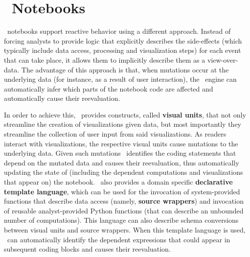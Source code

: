 \section{\projname\ Notebooks}


\projname\ notebooks support reactive behavior using a different approach. Instead of forcing analysts to provide logic that explicitly describes the side-effects (which typically include data access, processing and visualization steps) for each event that can take place, it allows them to implicitly describe them as a view-over-data. The advantage of this approach is that, when mutations occur at the underlying data (for instance, as a result of user interaction), the \projname\ engine can automatically infer which parts of the notebook code are affected and automatically cause their reevaluation. 

In order to achieve this, \projname\ provides constructs, called \textbf{visual units}, that not only streamline the creation of visualizations given data, but most importantly they streamline the collection of user input from said visualizations. As readers interact with visualizations, the respective visual units cause mutations to the underlying data. Given such mutations \projname\ identifies the coding statements that depend on the mutated data and causes their reevaluation, thus automatically updating the state of (including the dependent computations and visualizations that appear on) the notebook. \projname\ also provides a domain specific \textbf{declarative template language}, which can be used for the invocation of system-provided functions that describe data access (namely, \textbf{source wrappers}) and invocation of reusable analyst-provided Python functions (that can describe an unbounded number of computations). This language can also describe schema conversions between visual units and source wrappers. When this template language is used, \projname\ can automatically identify the dependent expressions that could appear in subsequent coding blocks and causes their reevaluation. 




